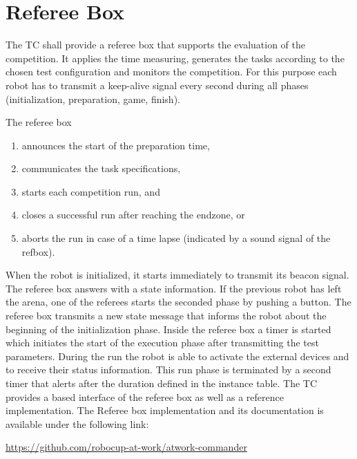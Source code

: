 \section{Referee Box}
\label{sec:refbox}
The TC shall provide a referee box that supports the evaluation of the competition. It applies the time measuring, generates the tasks according to the chosen test configuration and monitors the
competition. For this purpose each robot has to transmit a keep-alive signal every second during all phases (initialization, preparation, game, finish).

The referee box
\begin{enumerate}
	\item announces the start of the preparation time,
	\item communicates the task specifications,
	\item starts each competition run, and
	\item closes a successful run after reaching the endzone, or
	\item aborts the run in case of a time lapse (indicated by a sound signal of the refbox).
\end{enumerate}

When the robot is initialized, it starts immediately to transmit its beacon
signal. The referee box answers with a state information. If the previous robot
has left the arena, one of the referees starts the seconded phase by pushing a
button. The referee box transmits a new state message that informs the robot
about the beginning of the initialization phase. Inside the referee box a
timer is started which initiates the start of the execution phase after
transmitting the test parameters. During the run the robot is able to activate
the external devices and to receive their status information. This run phase is
terminated by a second timer that alerts after the duration defined in the
instance table.
%
% 
The TC provides a  based interface of the referee box as well as
a reference implementation.
The Referee box implementation and its documentation is available under the following link:
\begin{center}
	\url{https://github.com/robocup-at-work/atwork-commander}
	
\end{center}



